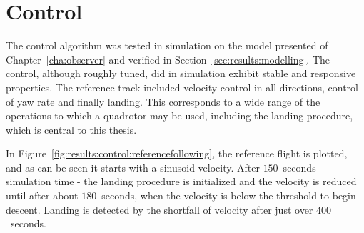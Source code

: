 \section{Control}
\label{sec:results:control}
    The control algorithm was tested in simulation on the model presented
    of Chapter~\ref{cha:observer} and verified in Section~\ref{sec:results:modelling}.
    The control, although roughly tuned, did in simulation exhibit stable and responsive
    properties. The reference track included velocity control in all directions,
    control of yaw rate and finally landing. This corresponds to a wide
    range of the operations to which a quadrotor may be used, including
    the landing procedure, which is central to this thesis.

    In Figure~\ref{fig:results:control:referencefollowing}, the reference
    flight is plotted, and as can be seen it starts with a sinusoid velocity.
    After $150$~seconds - simulation time - the landing procedure is initialized and the velocity is
    reduced until after about $180$~seconds, when the velocity is below the threshold
    to begin descent. Landing is detected by the shortfall of velocity
    after just over $400$~seconds.

